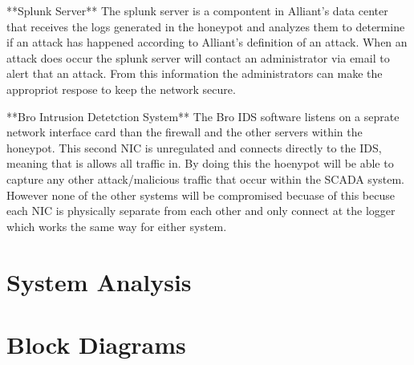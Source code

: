 **Splunk Server**
The splunk server is a compontent in Alliant's data center that receives the logs generated in the honeypot and analyzes them to determine if an attack has happened according to Alliant's definition of an attack.  When an attack does occur the splunk server will contact an administrator via email to alert that an attack.  From this information the administrators can make  the appropriot respose to keep the network secure.

**Bro Intrusion Detetction System**
The Bro IDS software listens on a seprate network interface card than the firewall and the other servers within the honeypot.  This second NIC is unregulated and connects directly to the IDS, meaning that is allows all traffic in.  By doing this the hoenypot will be able to capture any other attack/malicious traffic that occur within the SCADA system.  However none of the other systems will be compromised becuase of this becuse each NIC is physically separate from each other and only connect at the logger which works the same way for either system.  

\section{System Analysis}

\Blindtext

\section{Block Diagrams}

\Blindtext
